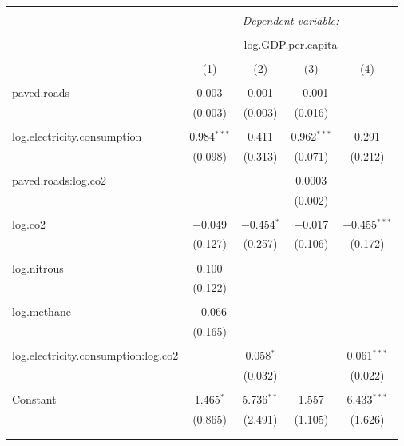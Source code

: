 \documentclass[11pt]{article}
\begin{document}
\begin{landscape}
\begin{table}[!htbp] \centering 
  \caption{} 
  \label{} 
\begin{tabular}{@{\extracolsep{5pt}}lcccc} 
\\[-1.8ex]\hline 
\hline \\[-1.8ex] 
 & \multicolumn{4}{c}{\textit{Dependent variable:}} \\ 
\cline{2-5} 
\\[-1.8ex] & \multicolumn{4}{c}{log.GDP.per.capita} \\ 
\\[-1.8ex] & (1) & (2) & (3) & (4)\\ 
\hline \\[-1.8ex] 
 paved.roads & 0.003 & 0.001 & $-$0.001 &  \\ 
  & (0.003) & (0.003) & (0.016) &  \\ 
  & & & & \\ 
 log.electricity.consumption & 0.984$^{***}$ & 0.411 & 0.962$^{***}$ & 0.291 \\ 
  & (0.098) & (0.313) & (0.071) & (0.212) \\ 
  & & & & \\ 
 paved.roads:log.co2 &  &  & 0.0003 &  \\ 
  &  &  & (0.002) &  \\ 
  & & & & \\ 
 log.co2 & $-$0.049 & $-$0.454$^{*}$ & $-$0.017 & $-$0.455$^{***}$ \\ 
  & (0.127) & (0.257) & (0.106) & (0.172) \\ 
  & & & & \\ 
 log.nitrous & 0.100 &  &  &  \\ 
  & (0.122) &  &  &  \\ 
  & & & & \\ 
 log.methane & $-$0.066 &  &  &  \\ 
  & (0.165) &  &  &  \\ 
  & & & & \\ 
 log.electricity.consumption:log.co2 &  & 0.058$^{*}$ &  & 0.061$^{***}$ \\ 
  &  & (0.032) &  & (0.022) \\ 
  & & & & \\ 
 Constant & 1.465$^{*}$ & 5.736$^{**}$ & 1.557 & 6.433$^{***}$ \\ 
  & (0.865) & (2.491) & (1.105) & (1.626) \\ 
  & & & & \\ 
\hline \\[-1.8ex] 

\end{tabular}
\end{table}
\end{landscape}
\end{document}
